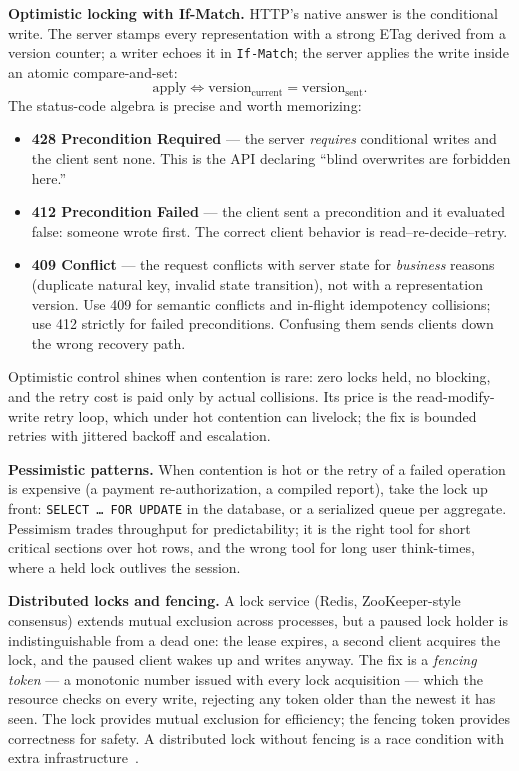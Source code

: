 \textbf{Optimistic locking with If-Match.} HTTP's native answer is the
conditional write. The server stamps every representation with a strong ETag
derived from a version counter; a writer echoes it in \texttt{If-Match}; the
server applies the write inside an atomic compare-and-set:
\[
  \text{apply} \iff \text{version}_{\text{current}} = \text{version}_{\text{sent}}.
\]
The status-code algebra is precise and worth memorizing:
\begin{itemize}
  \item \textbf{428 Precondition Required} --- the server \emph{requires}
        conditional writes and the client sent none. This is the API
        declaring ``blind overwrites are forbidden here.''
  \item \textbf{412 Precondition Failed} --- the client sent a precondition
        and it evaluated false: someone wrote first. The correct client
        behavior is read--re-decide--retry.
  \item \textbf{409 Conflict} --- the request conflicts with server state
        for \emph{business} reasons (duplicate natural key, invalid state
        transition), not with a representation version. Use 409 for semantic
        conflicts and in-flight idempotency collisions; use 412 strictly for
        failed preconditions. Confusing them sends clients down the wrong
        recovery path.
\end{itemize}
Optimistic control shines when contention is rare: zero locks held, no
blocking, and the retry cost is paid only by actual collisions. Its price is
the read-modify-write retry loop, which under hot contention can livelock;
the fix is bounded retries with jittered backoff and escalation.

\textbf{Pessimistic patterns.} When contention is hot or the retry of a
failed operation is expensive (a payment re-authorization, a compiled
report), take the lock up front: \texttt{SELECT \ldots\ FOR UPDATE} in the
database, or a serialized queue per aggregate. Pessimism trades throughput
for predictability; it is the right tool for short critical sections over
hot rows, and the wrong tool for long user think-times, where a held lock
outlives the session.

\textbf{Distributed locks and fencing.} A lock service (Redis,
ZooKeeper-style consensus) extends mutual exclusion across processes, but a
paused lock holder is indistinguishable from a dead one: the lease expires,
a second client acquires the lock, and the paused client wakes up and writes
anyway. The fix is a \emph{fencing token} --- a monotonic number issued with
every lock acquisition --- which the resource checks on every write,
rejecting any token older than the newest it has seen. The lock provides
mutual exclusion for efficiency; the fencing token provides correctness for
safety. A distributed lock without fencing is a race condition with extra
infrastructure~\cite{kleppmann2017ddia}.

